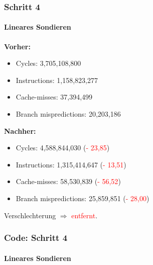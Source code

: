 \documentclass{beamer}
\newcommand{\fail}[1]{\textcolor{red}{#1}}
\begin{document}
  \begin{frame}
  	\frametitle{Schritt 4}
  	\framesubtitle{Lineares Sondieren}
  	\textbf{Vorher:}
  	\begin{itemize}
			\item Cycles: 3,705,108,800 \\
			\item Instructions: 1,158,823,277\\
			\item Cache-misses: 37,394,499\\
			\item Branch mispredictions: 20,203,186\\
		\end{itemize}	
		
		\textbf{Nachher:}
		\begin{itemize}
			\item Cycles: 4,588,844,030 (\fail{- 23,85})\\
			\item Instructions: 1,315,414,647 (\fail{- 13,51})\\
			\item Cache-misses: 58,530,839 (\fail{- 56,52})\\
			\item Branch mispredictions: 25,859,851 (\fail{- 28,00})\\
		\end{itemize}	
		Verschlechterung $\Rightarrow$ \fail{entfernt}.
  \end{frame}
  
  \begin{frame}
  	\frametitle{Code: Schritt 4}
  	\framesubtitle{Lineares Sondieren}
		\sLinear
  \end{frame}
    
\end{document}

